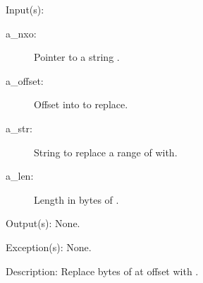 \begin{capi}
	\begin{capilist}
	\item[Input(s): ]
		\begin{description}\item[]
		\item[a\_nxo: ]
			Pointer to a string .
		\item[a\_offset: ]
			Offset into  to replace.
		\item[a\_str: ]
			String to replace a range of  with.
		\item[a\_len: ]
			Length in bytes of .
		\end{description}
	\item[Output(s): ] None.
	\item[Exception(s): ] None.
	\item[Description: ]
		Replace  bytes of  at offset
		 with .
	\end{capilist}
\end{capi}
